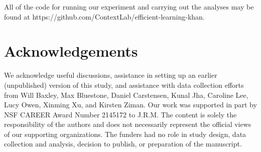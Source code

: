 \documentclass[10pt]{article}
\begin{document}
All of the code for running our experiment and carrying out the analyses may be
found at https://github.com/Con\-text\-Lab/eff\-ic\-ient-learn\-ing-khan.

\section*{Acknowledgements}

We acknowledge useful discussions, assistance in setting up an earlier
(unpublished) version of this study, and assistance with data collection
efforts from Will Baxley, Max Bluestone, Daniel Carstensen, Kunal Jha, Caroline
Lee, Lucy Owen, Xinming Xu, and Kirsten Ziman. Our work was supported in part
by NSF CAREER Award Number 2145172 to J.R.M. The content is solely the
responsibility of the authors and does not necessarily represent the official
views of our supporting organizations. The funders had no role in study design,
data collection and analysis, decision to publish, or preparation of the
manuscript.





\end{document}

